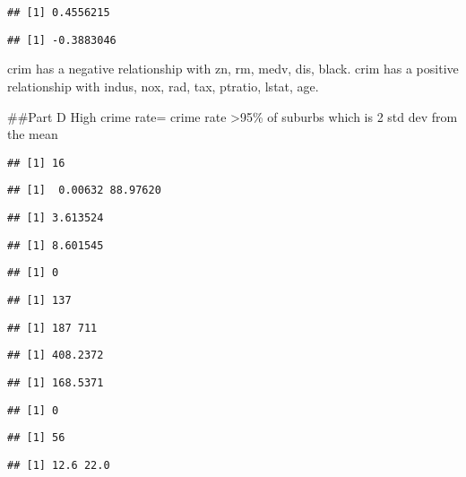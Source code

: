\documentclass[
]{article}
\begin{document}
\begin{verbatim}
## [1] 0.4556215
\end{verbatim}

\begin{verbatim}
## [1] -0.3883046
\end{verbatim}

crim has a negative relationship with zn, rm, medv, dis, black. crim has
a positive relationship with indus, nox, rad, tax, ptratio, lstat, age.

\#\#Part D High crime rate= crime rate \textgreater95\% of suburbs which
is 2 std dev from the mean

\begin{verbatim}
## [1] 16
\end{verbatim}

\begin{verbatim}
## [1]  0.00632 88.97620
\end{verbatim}

\begin{verbatim}
## [1] 3.613524
\end{verbatim}

\begin{verbatim}
## [1] 8.601545
\end{verbatim}

\begin{verbatim}
## [1] 0
\end{verbatim}

\begin{verbatim}
## [1] 137
\end{verbatim}

\begin{verbatim}
## [1] 187 711
\end{verbatim}

\begin{verbatim}
## [1] 408.2372
\end{verbatim}

\begin{verbatim}
## [1] 168.5371
\end{verbatim}

\begin{verbatim}
## [1] 0
\end{verbatim}

\begin{verbatim}
## [1] 56
\end{verbatim}

\begin{verbatim}
## [1] 12.6 22.0
\end{verbatim}
\end{document}
